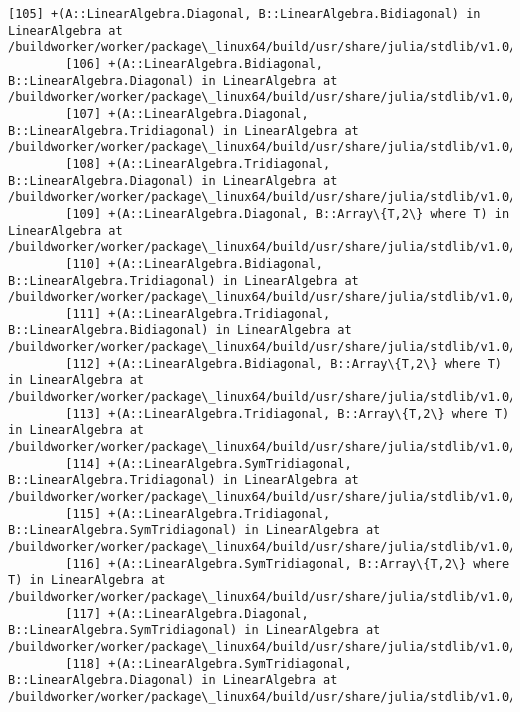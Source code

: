 \documentclass[11pt]{article}
\begin{document}
\begin{Verbatim}[commandchars=\\\{\}]
        [105] +(A::LinearAlgebra.Diagonal, B::LinearAlgebra.Bidiagonal) in LinearAlgebra at /buildworker/worker/package\_linux64/build/usr/share/julia/stdlib/v1.0/LinearAlgebra/src/special.jl:87
        [106] +(A::LinearAlgebra.Bidiagonal, B::LinearAlgebra.Diagonal) in LinearAlgebra at /buildworker/worker/package\_linux64/build/usr/share/julia/stdlib/v1.0/LinearAlgebra/src/special.jl:88
        [107] +(A::LinearAlgebra.Diagonal, B::LinearAlgebra.Tridiagonal) in LinearAlgebra at /buildworker/worker/package\_linux64/build/usr/share/julia/stdlib/v1.0/LinearAlgebra/src/special.jl:87
        [108] +(A::LinearAlgebra.Tridiagonal, B::LinearAlgebra.Diagonal) in LinearAlgebra at /buildworker/worker/package\_linux64/build/usr/share/julia/stdlib/v1.0/LinearAlgebra/src/special.jl:88
        [109] +(A::LinearAlgebra.Diagonal, B::Array\{T,2\} where T) in LinearAlgebra at /buildworker/worker/package\_linux64/build/usr/share/julia/stdlib/v1.0/LinearAlgebra/src/special.jl:87
        [110] +(A::LinearAlgebra.Bidiagonal, B::LinearAlgebra.Tridiagonal) in LinearAlgebra at /buildworker/worker/package\_linux64/build/usr/share/julia/stdlib/v1.0/LinearAlgebra/src/special.jl:87
        [111] +(A::LinearAlgebra.Tridiagonal, B::LinearAlgebra.Bidiagonal) in LinearAlgebra at /buildworker/worker/package\_linux64/build/usr/share/julia/stdlib/v1.0/LinearAlgebra/src/special.jl:88
        [112] +(A::LinearAlgebra.Bidiagonal, B::Array\{T,2\} where T) in LinearAlgebra at /buildworker/worker/package\_linux64/build/usr/share/julia/stdlib/v1.0/LinearAlgebra/src/special.jl:87
        [113] +(A::LinearAlgebra.Tridiagonal, B::Array\{T,2\} where T) in LinearAlgebra at /buildworker/worker/package\_linux64/build/usr/share/julia/stdlib/v1.0/LinearAlgebra/src/special.jl:87
        [114] +(A::LinearAlgebra.SymTridiagonal, B::LinearAlgebra.Tridiagonal) in LinearAlgebra at /buildworker/worker/package\_linux64/build/usr/share/julia/stdlib/v1.0/LinearAlgebra/src/special.jl:96
        [115] +(A::LinearAlgebra.Tridiagonal, B::LinearAlgebra.SymTridiagonal) in LinearAlgebra at /buildworker/worker/package\_linux64/build/usr/share/julia/stdlib/v1.0/LinearAlgebra/src/special.jl:97
        [116] +(A::LinearAlgebra.SymTridiagonal, B::Array\{T,2\} where T) in LinearAlgebra at /buildworker/worker/package\_linux64/build/usr/share/julia/stdlib/v1.0/LinearAlgebra/src/special.jl:96
        [117] +(A::LinearAlgebra.Diagonal, B::LinearAlgebra.SymTridiagonal) in LinearAlgebra at /buildworker/worker/package\_linux64/build/usr/share/julia/stdlib/v1.0/LinearAlgebra/src/special.jl:105
        [118] +(A::LinearAlgebra.SymTridiagonal, B::LinearAlgebra.Diagonal) in LinearAlgebra at /buildworker/worker/package\_linux64/build/usr/share/julia/stdlib/v1.0/LinearAlgebra/src/special.jl:106

\end{Verbatim}
\end{document}
